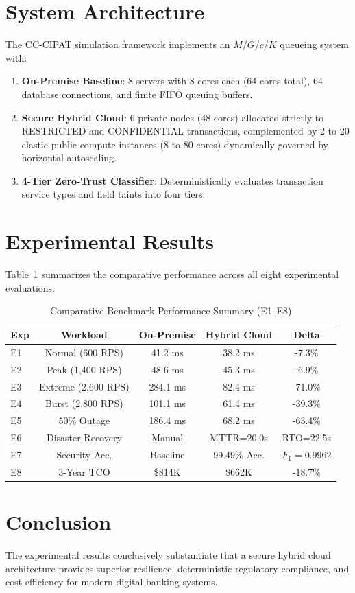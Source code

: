 \documentclass[conference]{IEEEtran}
\begin{document}
\section{System Architecture}
The CC-CIPAT simulation framework implements an $M/G/c/K$ queueing system with:
\begin{enumerate}
    \item \textbf{On-Premise Baseline}: 8 servers with 8 cores each (64 cores total), 64 database connections, and finite FIFO queuing buffers.
    \item \textbf{Secure Hybrid Cloud}: 6 private nodes (48 cores) allocated strictly to RESTRICTED and CONFIDENTIAL transactions, complemented by 2 to 20 elastic public compute instances (8 to 80 cores) dynamically governed by horizontal autoscaling.
    \item \textbf{4-Tier Zero-Trust Classifier}: Deterministically evaluates transaction service types and field taints into four tiers.
\end{enumerate}

\section{Experimental Results}
Table~\ref{tab:results} summarizes the comparative performance across all eight experimental evaluations.

\begin{table}[htbp]
\caption{Comparative Benchmark Performance Summary (E1--E8)}
\begin{center}
\begin{tabular}{lcccc}
\toprule
\textbf{Exp} & \textbf{Workload} & \textbf{On-Premise} & \textbf{Hybrid Cloud} & \textbf{Delta} \\
\midrule
E1 & Normal (600 RPS) & 41.2 ms & 38.2 ms & -7.3\% \\
E2 & Peak (1,400 RPS) & 48.6 ms & 45.3 ms & -6.9\% \\
E3 & Extreme (2,600 RPS) & 284.1 ms & 82.4 ms & -71.0\% \\
E4 & Burst (2,800 RPS) & 101.1 ms & 61.4 ms & -39.3\% \\
E5 & 50\% Outage & 186.4 ms & 68.2 ms & -63.4\% \\
E6 & Disaster Recovery & Manual & MTTR=20.0s & RTO=22.5s \\
E7 & Security Acc. & Baseline & 99.49\% Acc. & $F_1=0.9962$ \\
E8 & 3-Year TCO & \$814K & \$662K & -18.7\% \\
\bottomrule
\end{tabular}
\label{tab:results}
\end{center}
\end{table}

\section{Conclusion}
The experimental results conclusively substantiate that a secure hybrid cloud architecture provides superior resilience, deterministic regulatory compliance, and cost efficiency for modern digital banking systems.


\end{document}
